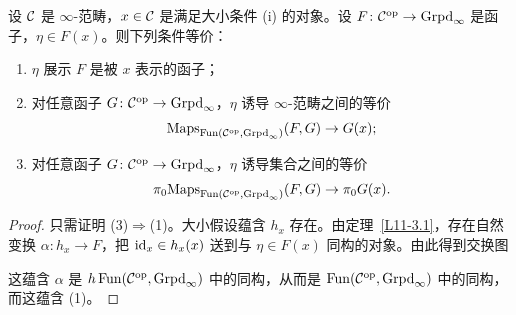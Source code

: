 \begin{proposition}\label{L11-3.4}
设 $\mathcal{C}$ 是 $\infty$-范畴，$x\in\mathcal{C}$ 是满足大小条件 (i) 的对象。设 $F\colon\mathcal{C}^{\mathrm{op}}\to\operatorname{Grpd}_\infty$ 是函子，$\eta\in F(x)$。则下列条件等价：
\begin{enumerate}[label=(\arabic*),leftmargin=2.4em,itemsep=0.15em]
\item $\eta$ 展示 $F$ 是被 $x$ 表示的函子；
\item 对任意函子 $G\colon\mathcal{C}^{\mathrm{op}}\to\operatorname{Grpd}_\infty$，$\eta$ 诱导 $\infty$-范畴之间的等价
\[
\mathrm{Maps}_{\operatorname{Fun}(\mathcal{C}^{\mathrm{op}},\operatorname{Grpd}_\infty)}(F,G)\to G(x);
\]
\item 对任意函子 $G\colon\mathcal{C}^{\mathrm{op}}\to\operatorname{Grpd}_\infty$，$\eta$ 诱导集合之间的等价
\[
\pi_0\mathrm{Maps}_{\operatorname{Fun}(\mathcal{C}^{\mathrm{op}},\operatorname{Grpd}_\infty)}(F,G)\to\pi_0G(x).
\]
\end{enumerate}
\end{proposition}

\begin{proof}
只需证明 (3)$\Rightarrow$(1)。大小假设蕴含 $h_x$ 存在。由定理~\ref{L11-3.1}，存在自然变换 $\alpha\colon h_x\to F$，把 $\operatorname{id}_x\in h_x(x)$ 送到与 $\eta\in F(x)$ 同构的对象。由此得到交换图
\begin{center}
\end{center}
这蕴含 $\alpha$ 是 $h\operatorname{Fun}(\mathcal{C}^{\mathrm{op}},\operatorname{Grpd}_\infty)$ 中的同构，从而是 $\operatorname{Fun}(\mathcal{C}^{\mathrm{op}},\operatorname{Grpd}_\infty)$ 中的同构，而这蕴含 (1)。
\end{proof}

